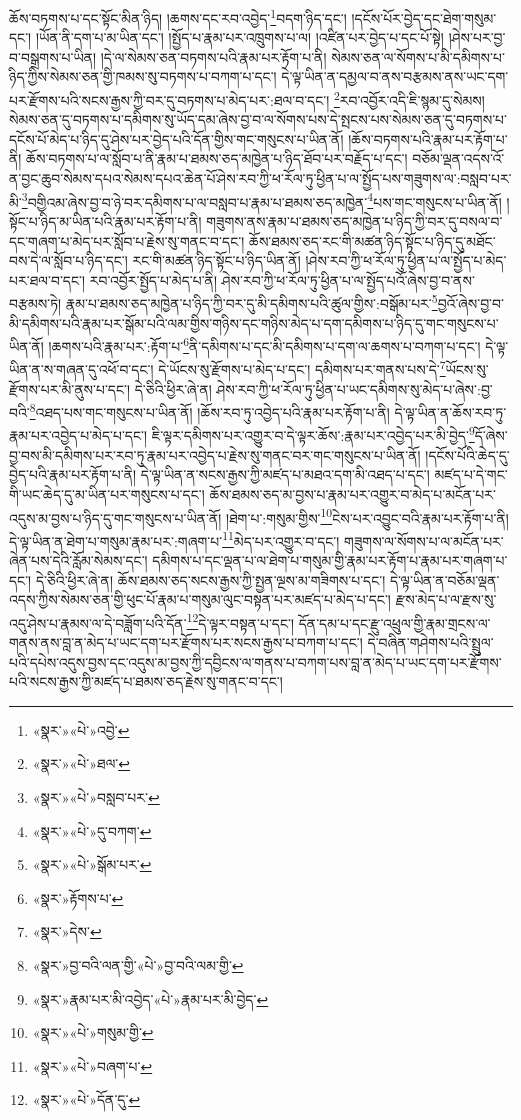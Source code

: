 ཆོས་བཏགས་པ་དང་སྟོང་མིན་ཉིད། །ཆགས་དང་རབ་འབྱེད་\footnote{«སྣར་»«པེ་»འབྱེ་}བདག་ཉིད་དང་། །དངོས་པོར་བྱེད་དང་ཐེག་གསུམ་དང་། །ཡོན་ནི་དག་པ་མ་ཡིན་དང་། །སྤྱོད་པ་རྣམ་པར་འཁྲུགས་པ་ལ། །འཛིན་པར་བྱེད་པ་དང་པོ་སྟེ། །ཤེས་པར་བྱ་བ་བསྒྲགས་པ་ཡིན། །དེ་ལ་སེམས་ཅན་བཏགས་པའི་རྣམ་པར་རྟོག་པ་ནི། སེམས་ཅན་ལ་སོགས་པ་མི་དམིགས་པ་ཉིད་ཀྱིས་སེམས་ཅན་གྱི་ཁམས་སུ་བཏགས་པ་བཀག་པ་དང་། དེ་ལྟ་ཡིན་ན་དམྱལ་བ་ནས་བརྩམས་ནས་ཡང་དག་པར་རྫོགས་པའི་སངས་རྒྱས་ཀྱི་བར་དུ་བཏགས་པ་མེད་པར་:ཐལ་བ་དང་། \footnote{«སྣར་»«པེ་»ཐལ་}རབ་འབྱོར་འདི་ཇི་སྙམ་དུ་སེམས། སེམས་ཅན་དུ་བཏགས་པ་དམིགས་སུ་ཡོད་དམ་ཞེས་བྱ་བ་ལ་སོགས་པས་དེ་སྤངས་པས་སེམས་ཅན་དུ་བཏགས་པ་དངོས་པོ་མེད་པ་ཉིད་དུ་ཤེས་པར་བྱེད་པའི་དོན་གྱིས་གང་གསུངས་པ་ཡིན་ནོ། །ཆོས་བཏགས་པའི་རྣམ་པར་རྟོག་པ་ནི། ཆོས་བཏགས་པ་ལ་སློབ་པ་ནི་རྣམ་པ་ཐམས་ཅད་མཁྱེན་པ་ཉིད་ཐོབ་པར་བརྗོད་པ་དང་། བཅོམ་ལྡན་འདས་འོ་ན་བྱང་ཆུབ་སེམས་དཔའ་སེམས་དཔའ་ཆེན་པོ་ཤེས་རབ་ཀྱི་ཕ་རོལ་ཏུ་ཕྱིན་པ་ལ་སྤྱོད་པས་གཟུགས་ལ་:བསླབ་པར་མི་\footnote{«སྣར་»«པེ་»བསླབ་པར་}བགྱིའམ་ཞེས་བྱ་བ་ཉེ་བར་དམིགས་པ་ལ་བསླབ་པ་རྣམ་པ་ཐམས་ཅད་མཁྱེན་\footnote{«སྣར་»«པེ་»དུ་བཀག་}པས་གང་གསུངས་པ་ཡིན་ནོ། །སྟོང་པ་ཉིད་མ་ཡིན་པའི་རྣམ་པར་རྟོག་པ་ནི། གཟུགས་ནས་རྣམ་པ་ཐམས་ཅད་མཁྱེན་པ་ཉིད་ཀྱི་བར་དུ་བསལ་བ་དང་གཞག་པ་མེད་པར་སློབ་པ་རྗེས་སུ་གནང་བ་དང་། ཆོས་ཐམས་ཅད་རང་གི་མཚན་ཉིད་སྟོང་པ་ཉིད་དུ་མཐོང་བས་དེ་ལ་སློབ་པ་ཉིད་དང་། རང་གི་མཚན་ཉིད་སྟོང་པ་ཉིད་ཡིན་ནོ། །ཤེས་རབ་ཀྱི་ཕ་རོལ་ཏུ་ཕྱིན་པ་ལ་སྤྱོད་པ་མེད་པར་ཐལ་བ་དང་། རབ་འབྱོར་སྤྱོད་པ་མེད་པ་ནི། ཤེས་རབ་ཀྱི་ཕ་རོལ་ཏུ་ཕྱིན་པ་ལ་སྤྱོད་པའོ་ཞེས་བྱ་བ་ནས་བརྩམས་ཏེ། རྣམ་པ་ཐམས་ཅད་མཁྱེན་པ་ཉིད་ཀྱི་བར་དུ་མི་དམིགས་པའི་ཚུལ་གྱིས་:བསྒོམ་པར་\footnote{«སྣར་»«པེ་»སྒོམ་པར་}བྱའོ་ཞེས་བྱ་བ་མི་དམིགས་པའི་རྣམ་པར་སྒོམ་པའི་ལམ་གྱིས་གཉིས་དང་གཉིས་མེད་པ་དག་དམིགས་པ་ཉིད་དུ་གང་གསུངས་པ་ཡིན་ནོ། །ཆགས་པའི་རྣམ་པར་:རྟོག་པ་\footnote{«སྣར་»རྟོགས་པ་}ནི་དམིགས་པ་དང་མི་དམིགས་པ་དག་ལ་ཆགས་པ་བཀག་པ་དང་། དེ་ལྟ་ཡིན་ན་ས་གཞན་དུ་འཕོ་བ་དང་། དེ་ཡོངས་སུ་རྫོགས་པ་མེད་པ་དང་། དམིགས་པར་གནས་པས་དེ་\footnote{«སྣར་»དེས་}ཡོངས་སུ་རྫོགས་པར་མི་ནུས་པ་དང་། དེ་ཅིའི་ཕྱིར་ཞེ་ན། ཤེས་རབ་ཀྱི་ཕ་རོལ་ཏུ་ཕྱིན་པ་ཡང་དམིགས་སུ་མེད་པ་ཞེས་:བྱ་བའི་\footnote{«སྣར་»བྱ་བའི་ལན་གྱི་«པེ་»བྱ་བའི་ལམ་གྱི་}འཐད་པས་གང་གསུངས་པ་ཡིན་ནོ། །ཆོས་རབ་ཏུ་འབྱེད་པའི་རྣམ་པར་རྟོག་པ་ནི། དེ་ལྟ་ཡིན་ན་ཆོས་རབ་ཏུ་རྣམ་པར་འབྱེད་པ་མེད་པ་དང་། ཇི་ལྟར་དམིགས་པར་འགྱུར་བ་དེ་ལྟར་ཆོས་:རྣམ་པར་འབྱེད་པར་མི་བྱེད་\footnote{«སྣར་»རྣམ་པར་མི་འབྱེད་«པེ་»རྣམ་པར་མི་བྱེད་}དོ་ཞེས་བྱ་བས་མི་དམིགས་པར་རབ་ཏུ་རྣམ་པར་འབྱེད་པ་རྗེས་སུ་གནང་བར་གང་གསུངས་པ་ཡིན་ནོ། །དངོས་པོའི་ཆེད་དུ་བྱེད་པའི་རྣམ་པར་རྟོག་པ་ནི། དེ་ལྟ་ཡིན་ན་སངས་རྒྱས་ཀྱི་མཛད་པ་མཐའ་དག་མི་འཐད་པ་དང་། མཛད་པ་དེ་གང་གི་ཡང་ཆེད་དུ་མ་ཡིན་པར་གསུངས་པ་དང་། ཆོས་ཐམས་ཅད་མ་བྱས་པ་རྣམ་པར་འགྱུར་བ་མེད་པ་མངོན་པར་འདུས་མ་བྱས་པ་ཉིད་དུ་གང་གསུངས་པ་ཡིན་ནོ། །ཐེག་པ་:གསུམ་གྱིས་\footnote{«སྣར་»«པེ་»གསུམ་གྱི་}ངེས་པར་འབྱུང་བའི་རྣམ་པར་རྟོག་པ་ནི། དེ་ལྟ་ཡིན་ན་ཐེག་པ་གསུམ་རྣམ་པར་:གཞག་པ་\footnote{«སྣར་»«པེ་»བཞག་པ་}མེད་པར་འགྱུར་བ་དང་། གཟུགས་ལ་སོགས་པ་ལ་མངོན་པར་ཞེན་པས་དེའི་རློམ་སེམས་དང་། དམིགས་པ་དང་ལྡན་པ་ལ་ཐེག་པ་གསུམ་གྱི་རྣམ་པར་རྟོག་པ་རྣམ་པར་གཞག་པ་དང་། དེ་ཅིའི་ཕྱིར་ཞེ་ན། ཆོས་ཐམས་ཅད་སངས་རྒྱས་ཀྱི་སྤྱན་ལྔས་མ་གཟིགས་པ་དང་། དེ་ལྟ་ཡིན་ན་བཅོམ་ལྡན་འདས་ཀྱིས་སེམས་ཅན་གྱི་ཕུང་པོ་རྣམ་པ་གསུམ་ལུང་བསྟན་པར་མཛད་པ་མེད་པ་དང་། རྫས་མེད་པ་ལ་རྫས་སུ་འདུ་ཤེས་པ་རྣམས་ལ་དེ་བཟློག་པའི་དོན་\footnote{«སྣར་»«པེ་»དོན་དུ་}དེ་ལྟར་བསྟན་པ་དང་། དོན་དམ་པ་དང་རྫུ་འཕྲུལ་གྱི་རྣམ་གྲངས་ལ་གནས་ནས་བླ་ན་མེད་པ་ཡང་དག་པར་རྫོགས་པར་སངས་རྒྱས་པ་བཀག་པ་དང་། དེ་བཞིན་གཤེགས་པའི་སྤྲུལ་པའི་དཔེས་འདུས་བྱས་དང་འདུས་མ་བྱས་ཀྱི་དབྱིངས་ལ་གནས་པ་བཀག་པས་བླ་ན་མེད་པ་ཡང་དག་པར་རྫོགས་པའི་སངས་རྒྱས་ཀྱི་མཛད་པ་ཐམས་ཅད་རྗེས་སུ་གནང་བ་དང་། 